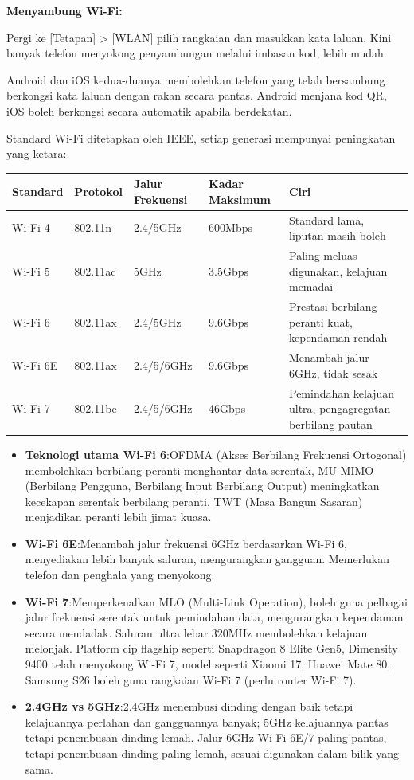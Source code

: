 \textbf{Menyambung Wi-Fi:}\par

Pergi ke [Tetapan] > [WLAN] pilih rangkaian dan masukkan kata laluan. Kini banyak telefon menyokong penyambungan melalui imbasan kod, lebih mudah.


Android dan iOS kedua-duanya membolehkan telefon yang telah bersambung berkongsi kata laluan dengan rakan secara pantas. Android menjana kod QR, iOS boleh berkongsi secara automatik apabila berdekatan.


Standard Wi-Fi ditetapkan oleh IEEE, setiap generasi mempunyai peningkatan yang ketara:

\begin{center}
\begin{tabularx}{\linewidth}{|X|X|X|X|X|}
\hline
\textbf{Standard} & \textbf{Protokol} & \textbf{Jalur Frekuensi} & \textbf{Kadar Maksimum} & \textbf{Ciri} \tabularnewline
\hline
Wi-Fi 4 & 802.11n & 2.4/5GHz & 600Mbps & Standard lama, liputan masih boleh \tabularnewline
Wi-Fi 5 & 802.11ac & 5GHz & 3.5Gbps & Paling meluas digunakan, kelajuan memadai \tabularnewline
Wi-Fi 6 & 802.11ax & 2.4/5GHz & 9.6Gbps & Prestasi berbilang peranti kuat, kependaman rendah \tabularnewline
Wi-Fi 6E & 802.11ax & 2.4/5/6GHz & 9.6Gbps & Menambah jalur 6GHz, tidak sesak \tabularnewline
Wi-Fi 7 & 802.11be & 2.4/5/6GHz & 46Gbps & Pemindahan kelajuan ultra, pengagregatan berbilang pautan \tabularnewline
\hline
\end{tabularx}
\end{center}

\begin{itemize}
  \item \textbf{Teknologi utama Wi-Fi 6}:OFDMA (Akses Berbilang Frekuensi Ortogonal) membolehkan berbilang peranti menghantar data serentak, MU-MIMO (Berbilang Pengguna, Berbilang Input Berbilang Output) meningkatkan kecekapan serentak berbilang peranti, TWT (Masa Bangun Sasaran) menjadikan peranti lebih jimat kuasa.
  \item \textbf{Wi-Fi 6E}:Menambah jalur frekuensi 6GHz berdasarkan Wi-Fi 6, menyediakan lebih banyak saluran, mengurangkan gangguan. Memerlukan telefon dan penghala yang menyokong.
  \item \textbf{Wi-Fi 7}:Memperkenalkan MLO (Multi-Link Operation), boleh guna pelbagai jalur frekuensi serentak untuk pemindahan data, mengurangkan kependaman secara mendadak. Saluran ultra lebar 320MHz membolehkan kelajuan melonjak. Platform cip flagship seperti Snapdragon 8 Elite Gen5, Dimensity 9400 telah menyokong Wi-Fi 7, model seperti Xiaomi 17, Huawei Mate 80, Samsung S26 boleh guna rangkaian Wi-Fi 7 (perlu router Wi-Fi 7).
  \item \textbf{2.4GHz vs 5GHz}:2.4GHz menembusi dinding dengan baik tetapi kelajuannya perlahan dan gangguannya banyak; 5GHz kelajuannya pantas tetapi penembusan dinding lemah. Jalur 6GHz Wi-Fi 6E/7 paling pantas, tetapi penembusan dinding paling lemah, sesuai digunakan dalam bilik yang sama.
\end{itemize}

